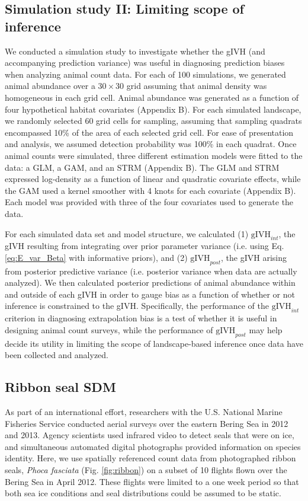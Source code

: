 \documentclass[12pt,english]{article}
\begin{document}
\begin{spacing}{1.9}
\subsection{Simulation study II: Limiting scope of inference}

We conducted a simulation study to investigate whether the gIVH (and accompanying prediction variance) was useful in diagnosing prediction biases when analyzing animal count data. For each of 100 simulations, we generated animal abundance over a $30 \times 30$ grid assuming that animal density was homogeneous in each grid cell.  Animal abundance was generated as a function of four hypothetical habitat covariates (Appendix B).   For each simulated landscape, we randomly selected 60 grid cells for sampling, assuming that sampling quadrats encompassed 10\% of the area of each selected grid cell.  For ease of presentation and analysis, we assumed detection probability was 100\% in each quadrat.  Once animal counts were simulated, three different estimation models were fitted to the data: a GLM, a GAM, and an STRM (Appendix B).  The GLM and STRM expressed log-density as a function of linear and quadratic covariate effects, while the GAM used a kernel smoother with 4 knots for each covariate (Appendix B).  Each model was provided with three of the four covariates used to generate the data.

For each simulated data set and model structure, we calculated (1) $\text{gIVH}_{int}$, the gIVH resulting from integrating over prior parameter variance (i.e. using Eq. \ref{eq:E_var_Beta} with informative priors), and (2) $\text{gIVH}_{post}$, the gIVH arising from posterior predictive variance (i.e. posterior variance when data are actually analyzed).  We then calculated posterior predictions of animal abundance within and outside of each gIVH in order to gauge bias as a function of whether or not inference is constrained to the gIVH.  Specifically, the performance of the $\text{gIVH}_{int}$ criterion in diagnosing extrapolation bias is a test of whether it is useful in designing animal count surveys, while the performance of $\text{gIVH}_{post}$ may help decide its utility in limiting the scope of landscape-based inference once data have been collected and analyzed.





\subsection{Ribbon seal SDM}
As part of an international effort, researchers with the U.S. National Marine Fisheries Service conducted aerial surveys over the eastern Bering Sea in 2012 and 2013.  Agency scientists used infrared video to detect seals that were on ice, and simultaneous automated digital photographs provided information on species identity. Here, we use spatially referenced count data from photographed ribbon seals, {\it Phoca fasciata} (Fig. \ref{fig:ribbon}) on a subset of 10 flights flown over the Bering Sea in April 2012.  These flights were limited to a one week period so that both sea ice conditions and seal distributions could be assumed to be static.


\end{spacing}
\end{document}
